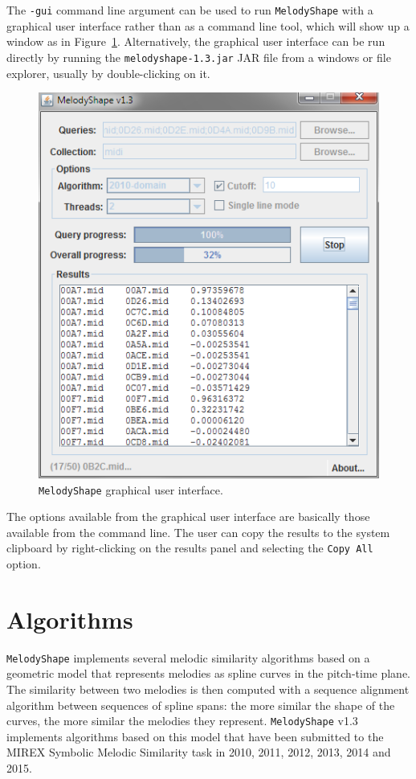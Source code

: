 \documentclass[twoside]{article}
\begin{document}
The \texttt{-gui} command line argument can be used to run \texttt{MelodyShape} with a graphical user interface rather than as a command line tool, which will show up a window as in Figure~\ref{fig:gui}. Alternatively, the graphical user interface can be run directly by running the \texttt{melodyshape-1.3.jar} JAR file from a windows or file explorer, usually by double-clicking on it.
\begin{figure}[!h]
\centering\includegraphics[scale=.6]{gui.png}
\caption{\texttt{MelodyShape} graphical user interface.}
\label{fig:gui}
\end{figure}

The options available from the graphical user interface are basically those available from the command line. The user can copy the results to the system clipboard by right-clicking on the results panel and selecting the \texttt{Copy All} option.

\section{Algorithms}

\texttt{MelodyShape} implements several melodic similarity algorithms based on a geometric model that represents melodies as spline curves in the pitch-time plane. The similarity between two melodies is then computed with a sequence alignment algorithm between sequences of spline spans: the more similar the shape of the curves, the more similar the melodies they represent. \texttt{MelodyShape} v1.3 implements algorithms based on this model that have been submitted to the MIREX Symbolic Melodic Similarity task in 2010, 2011, 2012, 2013, 2014 and 2015. 
\end{document}
